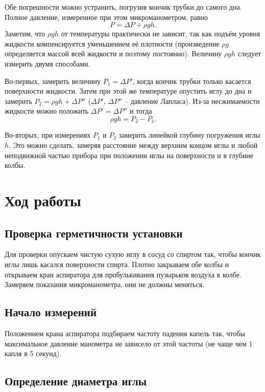 \documentclass[a4paper,12pt]{article}
\begin{document}
	Обе погрешности можно устранить, погрузив кончик трубки до самого дна. Полное давление, измеренное при этом микроманометром, равно \[ P = \Delta P + \rho g h.\] Заметим, что $ \rho gh $ от температуры практически не зависит, так как подъём уровня жидкости компенсируется уменьшением её плотности (произведение $ \rho g $ определяется массой всей жидкости и поэтому постоянно). Величину  $ \rho g h $ следует измерить двумя способами.

	Во-первых, замерить величину $ P_1= \Delta P' $, когда кончик трубки только касается поверхности жидкости. Затем при этой же температуре опустить иглу до дна и замерить $ P_2= \rho gh + \Delta P'' $ ($ \Delta P' $, $ \Delta P'' $ -- давление Лапласа). Из-за  несжимаемости  жидкости можно положить $ \Delta P' = \Delta P'' $ и тогда \[ \rho gh= P_2 - P_1. \]

	Во-вторых, при измерениях $ P_1 $ и $ P_2 $ замерить линейкой  глубину погружения иглы $ h $. Это можно сделать, замеряя расстояние между верхним концом иглы и любой неподвижной частью прибора при положении иглы на поверхности и в глубине колбы.


    \section{Ход работы}

    \subsection{Проверка герметичности установки}
    Для проверки опускаем чистую сухую иглу в сосуд со спиртом так, чтобы кончик иглы лишь касался поверхности спирта. Плотно закрываем обе колбы и открываем кран аспиратора для пробулькивания пузырьков воздуха в колбе. Замеряем показания микроманометра, они не должны меняться.

		\subsection{Начало измерений}

			Положением крана аспиратора подбираем частоту падения капель так, чтобы максимальное давление манометра не зависело от этой частоты (не чаще чем 1 капля в 5 секунд).

		\subsection{Определение диаметра иглы}
			\label{needle_diam}
\end{document}
